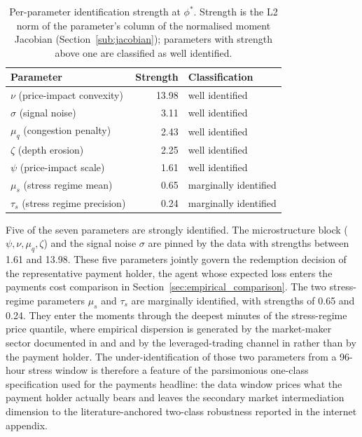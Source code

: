 \begin{table}[H]
\centering
\caption{Per-parameter identification strength at $\phi^*$. Strength is the L2 norm of the parameter's column of the normalised moment Jacobian (Section~\ref{sub:jacobian}); parameters with strength above one are classified as well identified.}\label{tab:identification}
\begin{tabular}{lrl}
\toprule
Parameter & Strength & Classification \\
\midrule
$\nu$ (price-impact convexity)  & 13.98 & well identified \\
$\sigma$ (signal noise)          & 3.11  & well identified \\
$\mu_q$ (congestion penalty)     & 2.43  & well identified \\
$\zeta$ (depth erosion)          & 2.25  & well identified \\
$\psi$ (price-impact scale)      & 1.61  & well identified \\
$\mu_s$ (stress regime mean)     & 0.65  & marginally identified \\
$\tau_s$ (stress regime precision) & 0.24 & marginally identified \\
\bottomrule
\end{tabular}
\end{table}

Five of the seven parameters are strongly identified. The microstructure block ($\psi, \nu, \mu_q, \zeta$) and the signal noise $\sigma$ are pinned by the data with strengths between 1.61 and 13.98. These five parameters jointly govern the redemption decision of the representative payment holder, the agent whose expected loss enters the payments cost comparison in Section~\ref{sec:empirical_comparison}. The two stress-regime parameters $\mu_s$ and $\tau_s$ are marginally identified, with strengths of 0.65 and 0.24. They enter the moments through the deepest minutes of the stress-regime price quantile, where empirical dispersion is generated by the market-maker sector documented in \citet{ma_zeng_zhang_2025} and \citet{lyons_viswanath_natraj_2023} and by the leveraged-trading channel in \citet{gorton_klee_ross_ross_vardoulakis_2026} rather than by the payment holder. The under-identification of those two parameters from a 96-hour stress window is therefore a feature of the parsimonious one-class specification used for the payments headline: the data window prices what the payment holder actually bears and leaves the secondary market intermediation dimension to the literature-anchored two-class robustness reported in the internet appendix.

